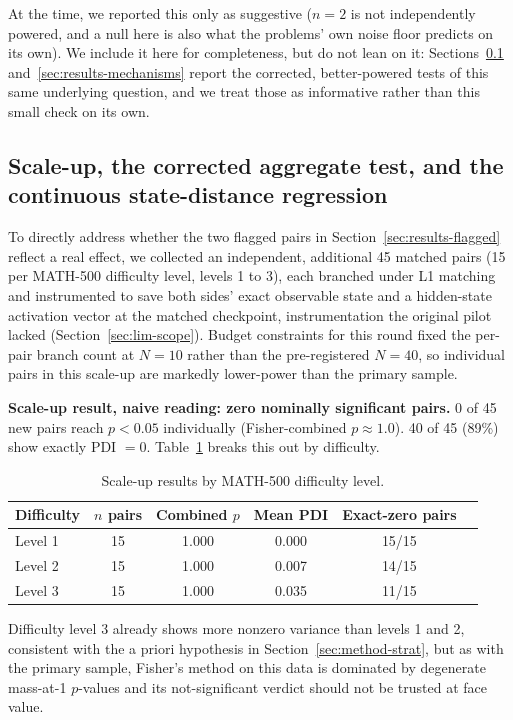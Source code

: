 \documentclass{article}
\begin{document}
At the time, we reported this only as suggestive ($n=2$ is not independently powered, and a null here is also what the problems' own noise floor predicts on its own). We include it here for completeness, but do not lean on it: Sections~\ref{sec:results-scaleup} and~\ref{sec:results-mechanisms} report the corrected, better-powered tests of this same underlying question, and we treat those as informative rather than this small check on its own.

\subsection{Scale-up, the corrected aggregate test, and the continuous state-distance regression}
\label{sec:results-scaleup}

To directly address whether the two flagged pairs in Section~\ref{sec:results-flagged} reflect a real effect, we collected an independent, additional 45 matched pairs (15 per MATH-500 difficulty level, levels 1 to 3), each branched under L1 matching and instrumented to save both sides' exact observable state and a hidden-state activation vector at the matched checkpoint, instrumentation the original pilot lacked (Section~\ref{sec:lim-scope}). Budget constraints for this round fixed the per-pair branch count at $N=10$ rather than the pre-registered $N=40$, so individual pairs in this scale-up are markedly lower-power than the primary sample.

\textbf{Scale-up result, naive reading: zero nominally significant pairs.} 0 of 45 new pairs reach $p<0.05$ individually (Fisher-combined $p \approx 1.0$). 40 of 45 (89\%) show exactly PDI $=0$. Table~\ref{tab:scaleup} breaks this out by difficulty.

\begin{table}[h]
\centering
\caption{Scale-up results by MATH-500 difficulty level.}
\label{tab:scaleup}
\begin{tabular}{lccccc}
\toprule
Difficulty & $n$ pairs & Combined $p$ & Mean PDI & Exact-zero pairs \\
\midrule
Level 1 & 15 & 1.000 & 0.000 & 15/15 \\
Level 2 & 15 & 1.000 & 0.007 & 14/15 \\
Level 3 & 15 & 1.000 & 0.035 & 11/15 \\
\bottomrule
\end{tabular}
\end{table}

Difficulty level 3 already shows more nonzero variance than levels 1 and 2, consistent with the a priori hypothesis in Section~\ref{sec:method-strat}, but as with the primary sample, Fisher's method on this data is dominated by degenerate mass-at-1 $p$-values and its not-significant verdict should not be trusted at face value.
\end{document}
